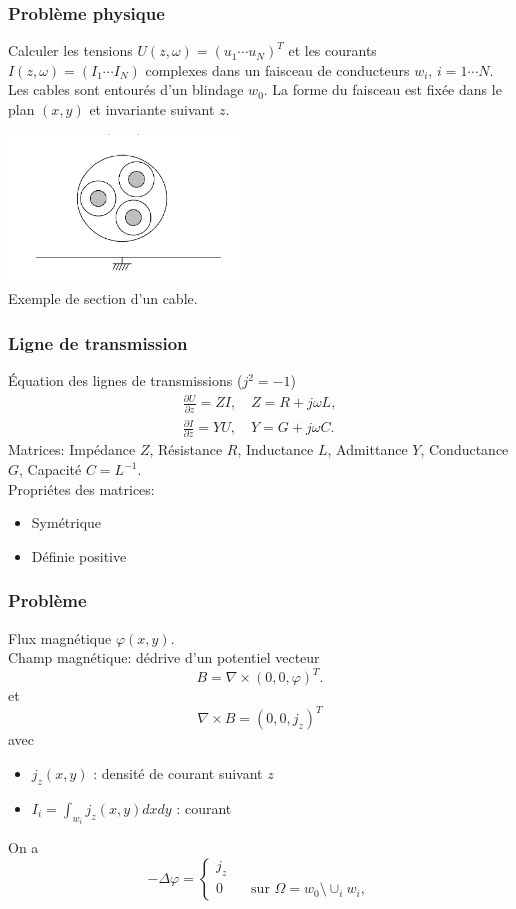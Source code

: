 \begin{frame}
  \frametitle{Probl\`eme physique}
  Calculer les tensions $U(z,\omega) =(u_1 \cdots u_N)^T$ et les courants
  $I(z,\omega) = (I_1\cdots I_N)$ complexes dans un faisceau de conducteurs
  $w_i$, $i=1\cdots N$. Les cables sont entour\'es d'un blindage $w_0$. La forme
  du faisceau est fix\'ee dans le plan $(x,y)$ et invariante suivant $z$.
  \begin{center}
    \includegraphics[height=4cm]{figures/f1}\\
    \small  Exemple de section d'un cable.
  \end{center}
\end{frame}


\begin{frame}
\frametitle{Ligne de transmission}
\'Equation des lignes de transmissions ($j^2=-1$)
\begin{eqnarray*}
\frac{\partial U}{\partial z} =ZI, \quad Z=R+j\omega L,\\
\frac{\partial I}{\partial z} =YU, \quad Y=G+j\omega C.
\end{eqnarray*}
Matrices: 
Imp\'edance $Z$, R\'esistance $R$, Inductance $L$, Admittance $Y$, Conductance $G$, Capacit\'e
$C=L^{-1}.$\\[0.4cm]
Propri\'etes des matrices: 
\begin{itemize}
\item Sym\'etrique
\item D\'efinie positive
\end{itemize}

\end{frame} 

\begin{frame}
\frametitle{Probl\`eme}
Flux magn\'etique $\varphi(x,y)$. \\
Champ magn\'etique: d\'edrive d'un potentiel vecteur 
$$B=\nabla \times (0,0,\varphi)^T.$$ et
$$\nabla\times B=(0,0,j_z)^T$$ avec
\begin{itemize}
\item  $j_z(x,y)$ : densit\'e de courant suivant $z$
\item  $I_i= \int _{w_i}j_z(x,y)dxdy$ :  courant
\end{itemize}
On a
\begin{equation}
-\Delta\varphi =
\begin{cases}
j_z \\ 
0 \qquad \text{sur } \Omega =w_0 \setminus \cup_i w_i,
\end{cases}
\end{equation} 
\end{frame}

